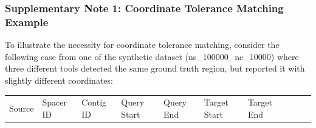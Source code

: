 \documentclass[
]{article}
\begin{document}
\subsubsection{Supplementary Note 1: Coordinate Tolerance Matching
Example}\label{note-supp-coord-tolerance}

To illustrate the necessity for coordinate tolerance matching, consider
the following case from one of the synthetic dataset
(ns\_100000\_nc\_10000) where three different tools detected the same
ground truth region, but reported it with slightly different
coordinates:

\begin{longtable}[]{@{}
  >{\raggedright\arraybackslash}p{}
  >{\raggedright\arraybackslash}p{}
  >{\raggedright\arraybackslash}p{}
  >{\raggedleft\arraybackslash}p{}
  >{\raggedleft\arraybackslash}p{}
  >{\raggedleft\arraybackslash}p{}
  >{\raggedleft\arraybackslash}p{}
  >{\raggedright\arraybackslash}p{}
  >{\raggedright\arraybackslash}p{}
  >{\raggedright\arraybackslash}p{}@{}}
\toprule\noalign{}
\begin{minipage}[b]{\linewidth}\raggedright
Source
\end{minipage} & \begin{minipage}[b]{\linewidth}\raggedright
Spacer ID
\end{minipage} & \begin{minipage}[b]{\linewidth}\raggedright
Contig ID
\end{minipage} & \begin{minipage}[b]{\linewidth}\raggedleft
Query Start
\end{minipage} & \begin{minipage}[b]{\linewidth}\raggedleft
Query End
\end{minipage} & \begin{minipage}[b]{\linewidth}\raggedleft
Target Start
\end{minipage} & \begin{minipage}[b]{\linewidth}\raggedleft
Target End
\end{minipage} & \begin{minipage}[b]{\linewidth}\raggedright

\end{minipage}
\end{longtable}
\end{document}
